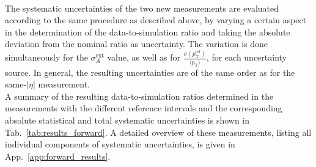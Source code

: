 \\
The systematic uncertainties of the two new measurements are evaluated according to the same procedure as described above, by varying a certain aspect in the determination of the data-to-simulation ratio and taking the absolute deviation from the nominal ratio as uncertainty. The variation is done simultaneously for the $\sigma_{A}^\mathrm{ext}$ value, as well as for $\frac{\sigma (p^\mathrm{ref}_\mathrm{T})}{{\langle p_\mathrm{T} \rangle}}$, for each uncertainty source. In general, the resulting uncertainties are of the same order as for the same-$|\eta|$ measurement. \\
A summary of the resulting data-to-simulation ratios determined in the measurements with the different reference intervals and the corresponding absolute statistical and total systematic uncertainties is shown in Tab.~\ref{tab:results_forward}. A detailed overview of these measurements, listing all individual components of systematic uncertainties, is given in App.~\ref{app:forward_results}. 

